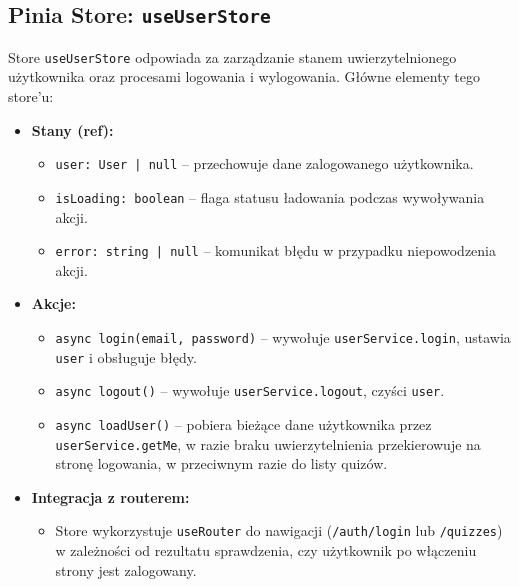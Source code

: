 \documentclass{article}
\begin{document}
      \subsection{Pinia Store: \texttt{useUserStore}}
      \label{sec:userStore}
      
      Store \texttt{useUserStore} odpowiada za zarządzanie stanem uwierzytelnionego użytkownika oraz procesami logowania i wylogowania. Główne elementy tego store’u:
      
      \begin{itemize}
        \item \textbf{Stany (ref):}
          \begin{itemize}
            \item \texttt{user: User | null} – przechowuje dane zalogowanego użytkownika.
            \item \texttt{isLoading: boolean} – flaga statusu ładowania podczas wywoływania akcji.
            \item \texttt{error: string | null} – komunikat błędu w przypadku niepowodzenia akcji.
          \end{itemize}
      
        \item \textbf{Akcje:}
          \begin{itemize}
            \item \texttt{async login(email, password)} – wywołuje \texttt{userService.login}, ustawia \texttt{user} i obsługuje błędy.
            \item \texttt{async logout()} – wywołuje \texttt{userService.logout}, czyści \texttt{user}.
            \item \texttt{async loadUser()} – pobiera bieżące dane użytkownika przez \texttt{userService.getMe}, w razie braku uwierzytelnienia przekierowuje na stronę logowania, w przeciwnym razie do listy quizów.
          \end{itemize}
      
        \item \textbf{Integracja z routerem:}
          \begin{itemize}
            \item Store wykorzystuje \texttt{useRouter} do nawigacji (\texttt{/auth/login} lub \texttt{/quizzes}) w zależności od rezultatu sprawdzenia, czy użytkownik po włączeniu strony jest zalogowany.
          \end{itemize}
      \end{itemize}
      
\end{document}
